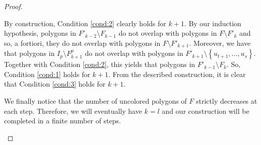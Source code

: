 \documentclass[12pt]{article}
\theoremstyle{definition}
\begin{document}
\begin{proof}
\begin{itemize}
                 By construction, Condition
                 \ref{cond:2} clearly holds for $k+1$.
                 By our induction hypothesis, 
                 polygons in $F'_{k-2} \setminus F_{k-1}$
                 do not overlap with
                 polygons in $F \setminus F'_{k}$
                 and so, a fortiori,
                 they do not overlap
                 with polygons in 
                 $F \setminus F'_{k+1}$.
                 Moreover, we have that
                 polygons in $I_{p} \setminus
                 F^{p}_{k+1}$ do not
                 overlap with polygons in
                 $F'_{k+1} \setminus
                 \left\{u_{t+1}, \ldots, u_{s}\right\}$.
                 Together with Condition
                 \ref{cond:2}, this yields
                 that polygons in
                 $F'_{k-1} \setminus F_{k}$.
                 So, Condition 
                 \ref{cond:1} holds
                 for $k+1$.
                 From the described
                 construction, it is clear that
                 Condition \ref{cond:3} holds for $k+1$.

                 We finally notice that the number
                 of uncolored polygons of $F$
                 strictly decreases at each step.
                 Therefore, we will eventually have
                 $k=l$ and our construction will
                 be completed in a finite number of steps. 
         \end{itemize}
         \end{proof}

     \printbibliography
\end{document}
